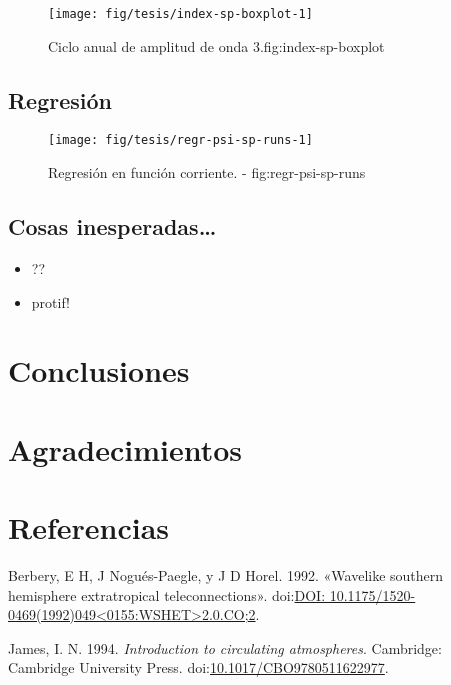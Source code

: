\documentclass[spanish,a4paper]{book}
\providecommand{\tightlist}{%
  \setlength{\itemsep}{0pt}\setlength{\parskip}{0pt}}
\begin{document}
\begin{figure}
\texttt{[image: fig/tesis/index-sp-boxplot-1]} \caption{Ciclo anual de amplitud de onda 3.{fig:index-sp-boxplot}}\label{fig:index-sp-boxplot}
\end{figure}

\section{Regresión}\label{regresion}

\begin{figure}
\texttt{[image: fig/tesis/regr-psi-sp-runs-1]} \caption{Regresión en función corriente. - fig:regr-psi-sp-runs}\label{fig:regr-psi-sp-runs}
\end{figure}

\section{Cosas inesperadas\ldots{}}\label{cosas-inesperadas}

\begin{itemize}
\tightlist
\item
  ??
\item
  protif!
\end{itemize}

\chapter{Conclusiones}\label{conclusiones}

\chapter{Agradecimientos}\label{agradecimientos}

\chapter*{Referencias}\label{referencias}

\hypertarget{refs}{}
\hypertarget{ref-Berbery1992}{}
Berbery, E H, J Nogués-Paegle, y J D Horel. 1992. «Wavelike southern
hemisphere extratropical teleconnections».
doi:\href{https://doi.org/DOI:\%2010.1175/1520-0469(1992)049\%3C0155:WSHET\%3E2.0.CO;2}{DOI: 10.1175/1520-0469(1992)049\textless{}0155:WSHET\textgreater{}2.0.CO;2}.

\hypertarget{ref-James}{}
James, I. N. 1994. \emph{Introduction to circulating atmospheres}.
Cambridge: Cambridge University Press.
doi:\href{https://doi.org/10.1017/CBO9780511622977}{10.1017/CBO9780511622977}.
\end{document}

